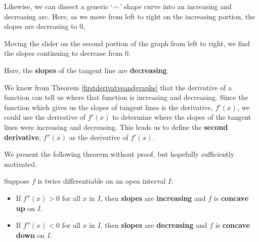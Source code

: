 \documentclass{ximera}
\begin{document}
Likewise, we can dissect a generic `$\frown$' shape curve into an increasing and decreasing arc.  Here, as we move from left to right on the increasing portion, the slopes are decreasing to $0$,

Moving the slider on the second portion of the graph from left to right, we find the slopes continuing to decrease from $0$.

\begin{center}
\end{center}


Here, the \textbf{slopes} of the tangent line are \textbf{decreasing}.  


We know from Theorem \ref{firstderivatveandgraphs} that the derivative of a function can tell us where that function is increasing and decreasing.  Since the function which gives us the slopes of tangent lines is the derivative, $f'(x)$, we could use the derivative of $f'(x)$ to determine where the slopes of the tangent lines were increasing and decreasing.  This leads us to define the \textbf{second derivative}, $f''(x)$  as the derivative of $f'(x)$.



We present the following theorem without proof, but hopefully sufficiently motivated. 




\begin{theorem}  \label{secondderivatveandgraphs}   Suppose $f$ is twice differentiable on an open interval $I$:

\begin{itemize}

\item If $f''(x) > 0$ for all $x$ in $I$, then \textbf{slopes} are \textbf{increasing} and  $f$ is \textbf{concave up} on $I$.  

\item If $f''(x) < 0$ for all $x$ in $I$, then \textbf{slopes} are \textbf{decreasing} and  $f$ is \textbf{concave down} on $I$. 

\end{itemize}

\end{theorem}

\end{document}
